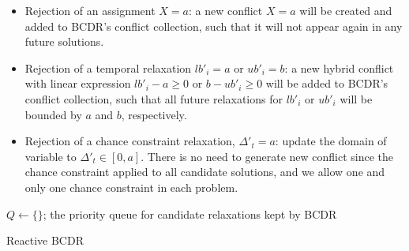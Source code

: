 \documentclass[jair,twoside,11pt,theapa]{article}
\begin{document}
\begin{itemize}
	
	\item Rejection of an assignment $X=a$: a new conflict $X=a$ will be created
	and added to BCDR's conflict collection, such that it will not appear again in
	any future solutions.
	
	
	\item Rejection of a temporal relaxation $lb'_i=a$ or $ub'_i=b$: a new
	hybrid conflict with linear expression $lb'_i-a \geq 0$ or $b-ub'_i \geq 0$ will be added to
	BCDR's conflict collection, such that all future relaxations for $lb'_i$ or
	$ub'_i$ will be bounded by $a$ and $b$, respectively.
	
	
	\item Rejection of a chance constraint relaxation, $\Delta'_t = a$: update the
	domain of variable to $\Delta'_t \in [0,a]$. There is no need to generate new
	conflict since the chance constraint applied to all candidate solutions, and we
	allow one and only one chance constraint in each problem.
	
\end{itemize}


\begin{algorithm}[h!]
	
	\SetAlgoLined
	\Indm
	\Initialize{}
	\;
	{$Q\leftarrow\{\}$; the priority queue for candidate relaxations kept by BCDR}\;
	\Indm
	\Algorithm{}
	\Indp

\caption{Reactive BCDR}
\label{alg:reactive_bcdr}
\end{algorithm}
\end{document}
